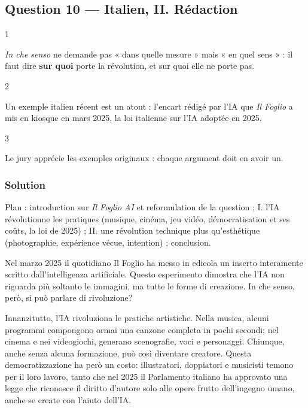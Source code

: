 \documentclass[11pt,a4paper]{article}
\begin{document}
\hypertarget{question-10-italien-ii.-ruxe9daction}{%
\subsection{Question 10 --- Italien, II. Rédaction}\label{question-10-italien-ii.-ruxe9daction}}

\begin{indication}{1}

\emph{In che senso} ne demande pas « dans quelle mesure » mais « en quel sens » : il faut dire \textbf{sur quoi} porte la révolution, et sur quoi elle ne porte pas.

\end{indication}

\begin{indication}{2}

Un exemple italien récent est un atout : l'encart rédigé par l'IA que \emph{Il Foglio} a mis en kiosque en mars 2025, la loi italienne sur l'IA adoptée en 2025.

\end{indication}

\begin{indication}{3}

Le jury apprécie les exemples originaux : chaque argument doit en avoir un.

\end{indication}

\hypertarget{solution-9}{%
\subsubsection{Solution}\label{solution-9}}

Plan : introduction sur \emph{Il Foglio AI} et reformulation de la question ; I. l'IA révolutionne les pratiques (musique, cinéma, jeu vidéo, démocratisation et ses coûts, la loi de 2025) ; II. une révolution technique plus qu'esthétique (photographie, expérience vécue, intention) ; conclusion.

Nel marzo 2025 il quotidiano Il Foglio ha messo in edicola un inserto interamente scritto dall'intelligenza artificiale. Questo esperimento dimostra che l'IA non riguarda più soltanto le immagini, ma tutte le forme di creazione. In che senso, però, si può parlare di rivoluzione?

Innanzitutto, l'IA rivoluziona le pratiche artistiche. Nella musica, alcuni programmi compongono ormai una canzone completa in pochi secondi; nel cinema e nei videogiochi, generano scenografie, voci e personaggi. Chiunque, anche senza alcuna formazione, può così diventare creatore. Questa democratizzazione ha però un costo: illustratori, doppiatori e musicisti temono per il loro lavoro, tanto che nel 2025 il Parlamento italiano ha approvato una legge che riconosce il diritto d'autore solo alle opere frutto dell'ingegno umano, anche se create con l'aiuto dell'IA.
\end{document}

